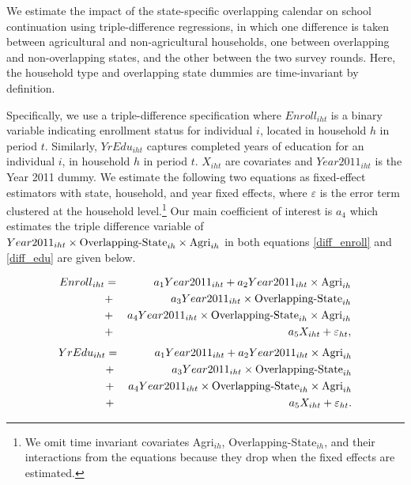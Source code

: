 \documentclass[12pt,letterpaper]{article}\usepackage[margin=1in]{geometry}
\newcommand{\0}{\ensuremath{\mbox{\boldmath $0$}}}
\begin{document}
We estimate the impact of the state-specific overlapping calendar on school continuation using triple-difference regressions, in which one difference is taken between agricultural and non-agricultural households, one between overlapping and non-overlapping states, and the other between the two survey rounds. Here, the household type and overlapping state dummies are time-invariant by definition.

Specifically, we use a triple-difference specification where ${Enroll}_{iht}$ is a binary variable indicating enrollment status for individual $i$, located in household $h$ in period $t$. Similarly, ${YrEdu}_{iht}$ captures completed years of education for an individual $i$, in household $h$ in period $t$. ${X}_{iht}$ are covariates and ${Year2011}_{iht}$ is the Year 2011 dummy. We estimate the following two equations as fixed-effect estimators with state, household, and year fixed effects, where $\varepsilon$ is the error term clustered at the household level.\footnote{We omit time invariant covariates Agri$_{ih}$, Overlapping-State$_{ih}$, and their interactions from the equations because they drop when the fixed effects are estimated. } Our main coefficient of interest is $a_4$ which estimates the triple difference variable of ${Year2011}_{iht}\times \textnormal{Overlapping-State}_{ih}\times\textnormal{Agri}_{ih}$ in both equations \ref{diff_enroll} and \ref{diff_edu} are given below.

\begin{eqnarray}
	{Enroll}_{iht} & = &
    a_1 {Year2011}_{iht}
    + a_2 {Year2011}_{iht}\times\textnormal{Agri}_{ih} \nonumber\\
    &+& a_3  {Year2011}_{iht}\times\textnormal{Overlapping-State}_{ih} \nonumber\\
    &+& a_4 {Year2011}_{iht}\times \textnormal{Overlapping-State}_{ih}\times\textnormal{Agri}_{ih}   \nonumber \\
    &+& a_5{X}_{iht} +\varepsilon_{ht}, \label{diff_enroll}
\end{eqnarray}
\begin{eqnarray}
	{YrEdu}_{iht} & = &
    a_1 {Year2011}_{iht}
    + a_2 {Year2011}_{iht}\times\textnormal{Agri}_{ih} \nonumber\\
    &+& a_3  {Year2011}_{iht}\times\textnormal{Overlapping-State}_{ih} \nonumber\\
    &+& a_4 {Year2011}_{iht}\times \textnormal{Overlapping-State}_{ih}\times\textnormal{Agri}_{ih}   \nonumber \\
    &+& a_5{X}_{iht} + \varepsilon_{ht}. \label{diff_edu}
\end{eqnarray}
\end{document}
